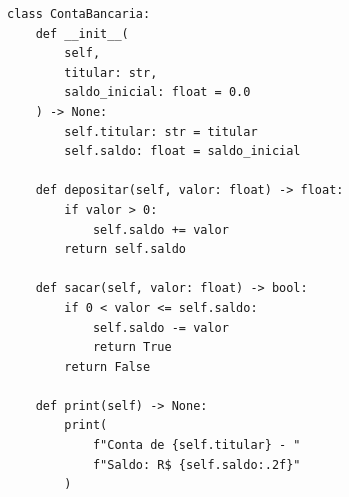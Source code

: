 \ifmostrarGabarito
\begin{verbatim}
class ContaBancaria:
    def __init__(
        self,
        titular: str,
        saldo_inicial: float = 0.0
    ) -> None:
        self.titular: str = titular
        self.saldo: float = saldo_inicial

    def depositar(self, valor: float) -> float:
        if valor > 0:
            self.saldo += valor
        return self.saldo

    def sacar(self, valor: float) -> bool:
        if 0 < valor <= self.saldo:
            self.saldo -= valor
            return True
        return False

    def print(self) -> None:
        print(
            f"Conta de {self.titular} - "
            f"Saldo: R$ {self.saldo:.2f}"
        )
\end{verbatim}

\fi
